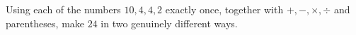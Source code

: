 Using each of the numbers $10,4,4,2$ exactly once, together with $+,-,\times,\div$ and parentheses, make $24$ in two genuinely different ways.

